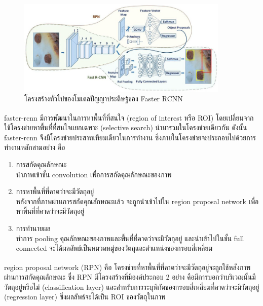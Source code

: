 \begin{figure}[!ht]
    \centering
    \includegraphics[width=0.9\textwidth]{chapter2/images/faster_rcnn.png}
    \caption{โครงสร้างทั่วไปของโมเดลปัญญาประดิษฐ์ของ Faster RCNN}
    \label{fig:faster_rcnn_architecture}
\end{figure}
\par faster-rcnn\textsuperscript{\cite{faster}} มีการพัฒนาในการหาพื้นที่ที่สนใจ (region of interest หรือ ROI) โดยเปลี่ยนจากใช้โครงข่ายหาพื้นที่ที่สนใจแยกเฉพาะ (selective search) นำมารวมในโครงข่ายเดียวกัน 
ดังนั้น faster-rcnn จึงมีโครงข่ายประสาทเทียมเดียวในการทำงาน ซึ่งภายในโครงข่ายจะประกอบไปด้วยการทำงานหลักสามอย่าง คือ
\begin{enumerate}
	\setlength\itemsep{-0.25em}
	\item การสกัดคุณลักษณะ
	\\	นำภาพเข้าชั้น convolution เพื่อการสกัดคุณลักษณะของภาพ
	\item การหาพื้นที่ที่คาดว่าจะมีวัตถุอยู่
	\\	หลังจากที่ภาพผ่านการสกัดคุณลักษณะแล้ว จะถูกนำเข้าไปใน region proposal network เพื่อหาพื้นที่ที่คาดว่าจะมีวัตถุอยู่
	\item การทำนายผล
	\\	ทำการ pooling คุณลักษณะของภาพและพื้นที่ที่คาดว่าจะมีวัตถุอยู่ และนำเข้าไปในชั้น full connected จะได้ผลลัพธ์เป็นหมวดหมู่ของวัตถุและตำแหน่งของกรอบสี่เหลี่ยม  
\end{enumerate}
\par region proposal network (RPN)\textsuperscript{\cite{faster}} คือ โครงข่ายที่หาพื้นที่ที่คาดว่าจะมีวัตถุอยู่จะถูกใช้หลังภาพผ่านการสกัดคุณลักษณะ ซึ่ง RPN มีโครงสร้างที่มีองค์ประกอบ 2 อย่าง
คือมีการบอกว่าบริเวณนั้นมีวัตถุอยู่หรือไม่ (classification layer) และสำหรับการระบุพิกัดของกรอบสี่เหลี่ยมที่คาดว่าจะมีวัตถุอยู่ (regression layer) ซึ่งผลลัพธ์จะได้เป็น ROI ของวัตถุในภาพ 